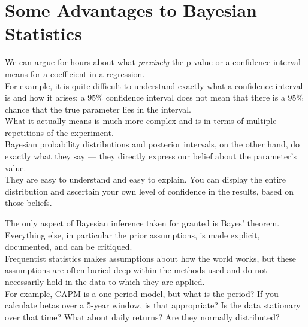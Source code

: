\documentclass[14pt]{extarticle}
\begin{document}
\section{Some Advantages to Bayesian Statistics}

\begin{description}
	\item[The results are understandable.] We can argue for hours about what \textit{precisely} the p-value or a confidence interval means for a coefficient in a regression. \\
	
	For example, it is quite difficult to understand exactly what a confidence interval is and how it arises; a 95\% confidence interval does not mean that there is a 95\% chance that the true parameter lies in the interval. \\
	
	What it actually means is much more complex and is in terms of multiple repetitions of the experiment. \\
	
	Bayesian probability distributions and posterior intervals, on the other hand, do exactly what they say — they directly express our belief about the parameter’s value. \\
	
	They are easy to understand and easy to explain. You can display the entire distribution and ascertain your own level of confidence in the results, based on those beliefs.


	\item\hspace*{-\labelsep}{\bfseries All parts of the model, including priors and other assumptions, are explicit and open to criticism.}\hspace*{\labelsep} The only aspect of Bayesian inference taken for granted is Bayes’ theorem. Everything else, in particular the prior assumptions, is made explicit, documented, and can be critiqued. \\
	
	Frequentist statistics makes assumptions about how the world works, but these assumptions are often buried deep within the methods used and do not necessarily hold in the data to which they are applied. \\
	
	For example, CAPM is a one-period model, but what is the period? If you calculate betas over a 5-year window, is that appropriate? Is the data stationary over that time? What about daily returns? Are they normally distributed? \\
	

\end{description}
\end{document}
